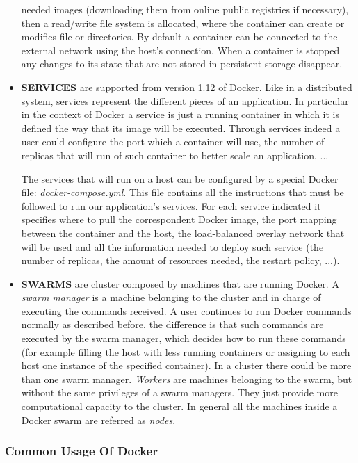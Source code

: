 \documentclass[a4paper,12pt]{article}
\begin{document}
\begin{itemize}
  needed images (downloading them from online public registries if necessary),
  then a read/write file system is allocated, where the container can create or
  modifies file or directories.  By default a container can be connected to the
  external network using the host's connection. When a container is stopped  any
  changes to its state that are not stored in persistent storage disappear.
  \item \textbf{SERVICES} are supported from version 1.12 of Docker. Like in a
  distributed system, services represent the different pieces of an application.
  In particular in the context of Docker a service is just a running container
  in which it is defined the way that its image will be executed. Through
  services indeed a user could configure the port which a container will use,
  the number of replicas that will run of such container to better scale an
  application, ... \par The services that will run on a host can be
  configured by a special Docker file: \textit{docker-compose.yml}. This file
  contains all the instructions that must be followed to run our application's
  services. For each service indicated it specifies where to pull the
  correspondent Docker image, the port mapping between the container and the
  host, the load-balanced overlay network that will be used and all the
  information needed to deploy such service (the number of replicas, the amount
  of resources needed, the restart policy, ...).
  \item \textbf{SWARMS} are cluster composed by machines that are running
  Docker. A \textit{swarm manager} is a machine belonging to the cluster and in
  charge of executing the commands received. A user continues to run Docker
  commands normally as described before, the difference is that such commands
  are executed by the swarm manager, which decides how to run these commands
  (for example filling the host with less running containers or assigning to
  each host one instance of the specified container). In a cluster there could
  be more than one swarm manager. \textit{Workers} are machines belonging to the
  swarm, but without the same privileges of a swarm managers. They just provide
  more computational capacity to the cluster. In general all the machines inside
  a Docker swarm are referred as \textit{nodes}.
\end{itemize}

\subsubsection{Common Usage Of Docker}
\end{document}
